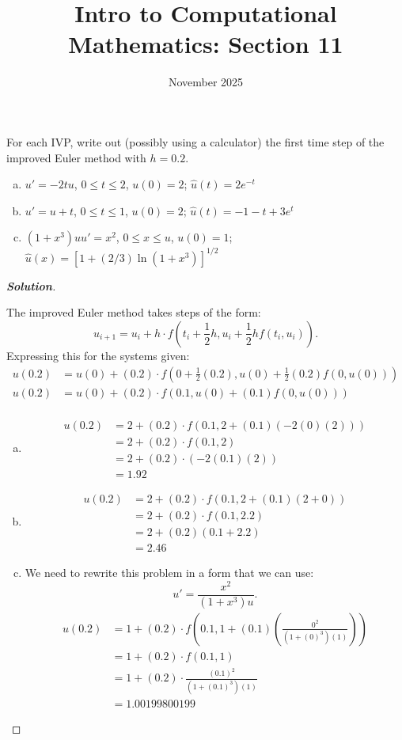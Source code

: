 \documentclass[11pt]{article}
\title{Intro to Computational Mathematics: Section 11}
\date{November 2025}
\newenvironment{problem}[2][Question]{\begin{trivlist}
\item[\hskip \labelsep {\bfseries #1}\hskip \labelsep {\bfseries #2.}]}{\end{trivlist}}
\newenvironment{solution}{%
  \begin{proof}[\textbf{Solution}]$ $\par\nobreak\ignorespaces
}{%
  \end{proof}
}
\theoremstyle{definition}
\begin{document}
\maketitle

\begin{problem}{6.4.1}
For each IVP, write out (possibly using a calculator) the first time step of the improved Euler method with $h = 0.2$.
\begin{enumerate}[(a)]
    \item $u' = -2tu$, $0 \leq t \leq 2$, $u(0) = 2$; $\hat{u}(t) = 2e^{-t}$
    \item $u' = u + t$, $0 \leq t \leq 1$, $u(0) = 2$; $\hat{u}(t) = -1 -t + 3e^t$
    \item $(1 + x^3)uu' = x^2$, $0 \leq x \leq u$, $u(0) = 1$; $\hat{u}(x) = [1 + (2/3)\ln(1 + x^3)]^{1/2}$
\end{enumerate}
\end{problem}
\begin{solution}
The improved Euler method takes steps of the form: $$u_{i+1} = u_i + h \cdot f\left(t_i + \frac{1}{2}h, u_i + \frac{1}{2}h f(t_i, u_i)\right).$$ Expressing this for the systems given:
\begin{align*}
    u(0.2) &= u(0) + (0.2)\cdot f\left(0 + \frac{1}{2}(0.2), u(0) + \frac{1}{2}(0.2)f(0, u(0)) \right) \\
    u(0.2) &= u(0) + (0.2)\cdot f\left(0.1 , u(0) + (0.1)f(0, u(0)) \right) \\
\end{align*}

\begin{enumerate}[(a)]
    \item
    \begin{align*}
        u(0.2) &= 2 + (0.2)\cdot f\left(0.1 , 2 + (0.1)(-2(0)(2)) \right) \\
        &= 2 + (0.2)\cdot f\left(0.1 , 2 \right) \\
        &= 2 + (0.2)\cdot (-2(0.1)(2)) \\
        &= 1.92
    \end{align*}
    \item
    \begin{align*}
        u(0.2) &= 2 + (0.2)\cdot f\left(0.1 , 2 + (0.1)(2 + 0) \right) \\
        &= 2 + (0.2)\cdot f\left(0.1 , 2.2 \right) \\
        &= 2 + (0.2)(0.1 + 2.2) \\
        &= 2.46
    \end{align*}
    \item We need to rewrite this problem in a form that we can use:
    $$u' = \frac{x^2}{(1 + x^3)u}.$$
    \begin{align*}
        u(0.2) &= 1 + (0.2)\cdot f\left(0.1 , 1 + (0.1)\left(\frac{0^2}{(1 + (0)^3)(1)}\right) \right) \\
        &= 1 + (0.2)\cdot f\left(0.1 , 1 \right) \\
        &= 1 + (0.2)\cdot \frac{(0.1)^2}{(1 + (0.1)^3)(1)} \\
        &= 1.00199800199
    \end{align*}
\end{enumerate}
\end{solution}
\end{document}
